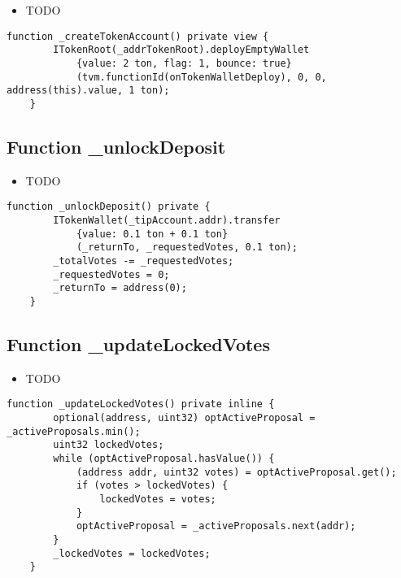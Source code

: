 \begin{itemize}
\item TODO
\end{itemize}

\begin{lstlisting}[firstnumber=197]
    function _createTokenAccount() private view {
        ITokenRoot(_addrTokenRoot).deployEmptyWallet
            {value: 2 ton, flag: 1, bounce: true}
            (tvm.functionId(onTokenWalletDeploy), 0, 0, address(this).value, 1 ton);
    }
\end{lstlisting}

\subsection{Function \_{}unlockDeposit}

\begin{itemize}
\item TODO
\end{itemize}

\begin{lstlisting}[firstnumber=146]
    function _unlockDeposit() private {
        ITokenWallet(_tipAccount.addr).transfer
            {value: 0.1 ton + 0.1 ton}
            (_returnTo, _requestedVotes, 0.1 ton);
        _totalVotes -= _requestedVotes;
        _requestedVotes = 0;
        _returnTo = address(0);
    }
\end{lstlisting}

\subsection{Function \_{}updateLockedVotes}

\begin{itemize}
\item TODO
\end{itemize}

\begin{lstlisting}[firstnumber=155]
    function _updateLockedVotes() private inline {
        optional(address, uint32) optActiveProposal = _activeProposals.min();
        uint32 lockedVotes;
        while (optActiveProposal.hasValue()) {
            (address addr, uint32 votes) = optActiveProposal.get();
            if (votes > lockedVotes) {
                lockedVotes = votes;
            }
            optActiveProposal = _activeProposals.next(addr);
        }
        _lockedVotes = lockedVotes;
    }
\end{lstlisting}
